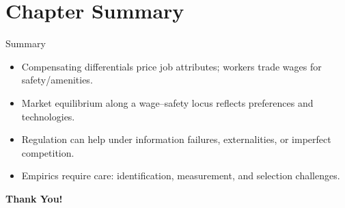 \documentclass[aspectratio=169]{beamer}
\begin{document}
\section{Chapter Summary}

\begin{frame}{Summary}
\transfade
\begin{itemize}[<+->]
  \item Compensating differentials price job attributes; workers trade wages for safety/amenities.
  \item Market equilibrium along a wage–safety locus reflects preferences and technologies.
  \item Regulation can help under information failures, externalities, or imperfect competition.
  \item Empirics require care: identification, measurement, and selection challenges.
\end{itemize}
\end{frame}

\begin{frame}
\centering
\Huge{\textbf{Thank You!}} \\

\end{frame}
\end{document}

